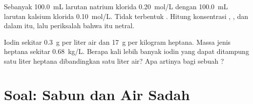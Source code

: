 \begin{exercise}[$\star\star\star$]\label{exo:g11:dissolution:14}
Sebanyak \qty{100.0}{mL} larutan natrium klorida \qty{0.20}{mol/L}
 dengan \qty{100.0}{mL} larutan kalsium klorida
\qty{0.10}{mol/L}. Tidak terbentuk . Hitung konsentrasi
, , dan  dalam  itu, lalu periksalah
bahwa  itu netral.
\end{exercise}

\begin{exercise}[$\star\star\star$]\label{exo:g11:dissolution:15}
Iodin  sekitar \qty{0.3}{g} per liter air dan \qty{17}{g} per
kilogram heptana. Massa jenis heptana sekitar \qty{0.68}{kg/L}. Berapa
kali lebih banyak iodin yang dapat ditampung satu liter heptana
dibandingkan satu liter air? Apa artinya bagi sebuah ?
\end{exercise}

\section{Soal: Sabun dan Air Sadah}


